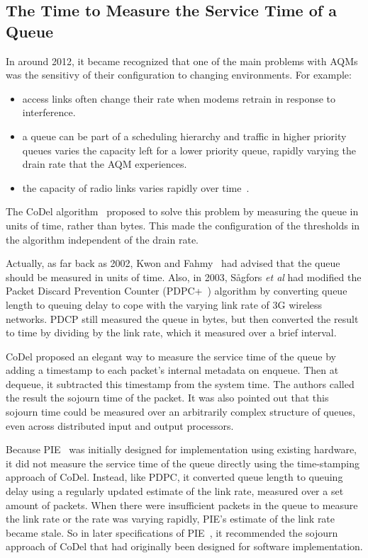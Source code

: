 \subsection{The Time to Measure the Service Time of a Queue}\label{sec:svc_time}

In around 2012, it became recognized that one of the main problems with AQMs was the sensitivy of their configuration to changing environments. For example:
\begin{itemize}
	\item access links often change their rate when modems retrain in response to interference. 
	\item a queue can be part of a scheduling hierarchy and traffic in higher priority queues varies the capacity left for a lower priority queue, rapidly varying the drain rate that the AQM experiences.
	\item the capacity of radio links varies rapidly over time~\cite{McGregor10:Minstrel_TR}.
\end{itemize}

The CoDel algorithm~\cite{Nichols12:CoDel} proposed to solve this problem by measuring the queue in units of time, rather than bytes. This made the configuration of the thresholds in the algorithm independent of the drain rate.

Actually, as far back as 2002, 
Kwon and Fahmy~\cite{Kwon02:Load_v_Queue_AQM} had advised that the queue should 
be measured in units of time. Also, in 2003, S{\aa}gfors \emph{et al} had 
modified the Packet Discard Prevention Counter (PDPC+~\cite{Sagfors03:PDPC_vary}) 
algorithm by converting queue length to queuing delay to cope with the varying 
link rate of 3G wireless networks. PDCP still measured the queue in bytes, but then converted the result to time by dividing by the link rate, which it measured over a brief interval. 

CoDel proposed an elegant way to measure the service time of the queue by adding a timestamp to each packet's internal metadata on enqueue. Then at dequeue, it subtracted this timestamp from the system time. The authors called the result the sojourn time of the packet. It was also pointed out that this sojourn time could be measured over an arbitrarily complex structure of queues, even across distributed input and output processors.

Because PIE~\cite{Pan13:PIE} was initially designed for implementation using existing hardware, it did not measure the service time of the queue directly using the time-stamping approach of CoDel.
Instead, like PDPC, it converted queue length to queuing delay using a regularly updated 
estimate of the link rate, measured over a set amount of packets. When there were insufficient packets in the queue to measure the link rate or the rate was varying rapidly, PIE's estimate of the link rate became stale. So in later specifications of PIE~\cite{Pan17:PIE}, it recommended the sojourn approach of CoDel that had originally been designed for software implementation.

